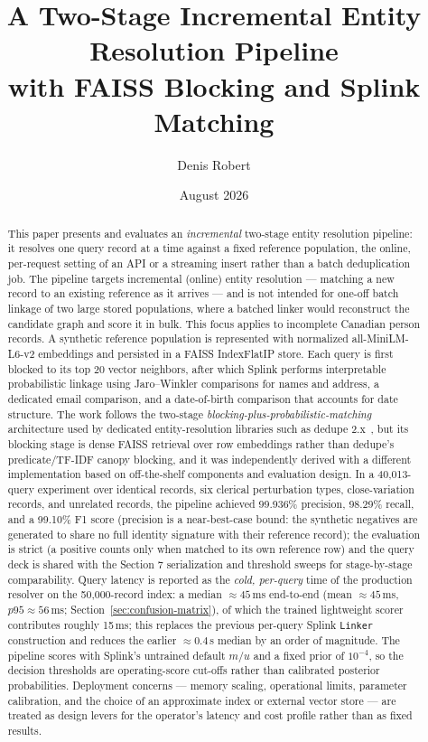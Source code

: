 \documentclass[11pt]{article}
\title{A Two-Stage Incremental Entity Resolution Pipeline\\with FAISS Blocking and Splink Matching}
\author{Denis Robert}
\date{August 2026}
\begin{document}
\maketitle

\begin{abstract}
This paper presents and evaluates an \emph{incremental} two-stage entity resolution pipeline: it resolves one query record at a time against a fixed reference population, the online, per-request setting of an API or a streaming insert rather than a batch deduplication job. The pipeline targets incremental (online) entity resolution --- matching a new record to an existing reference as it arrives --- and is not intended for one-off batch linkage of two large stored populations, where a batched linker would reconstruct the candidate graph and score it in bulk. This focus applies to incomplete Canadian person records. A synthetic reference population is represented with normalized all-MiniLM-L6-v2 embeddings and persisted in a FAISS IndexFlatIP store. Each query is first blocked to its top 20 vector neighbors, after which Splink performs interpretable probabilistic linkage using Jaro--Winkler comparisons for names and address, a dedicated email comparison, and a date-of-birth comparison that accounts for date structure. The work follows the two-stage \emph{blocking-plus-probabilistic-matching} architecture used by dedicated entity-resolution libraries such as dedupe 2.x~\cite{dedupe2022}, but its blocking stage is dense FAISS retrieval over row embeddings rather than dedupe's predicate/TF-IDF canopy blocking, and it was independently derived with a different implementation based on off-the-shelf components and evaluation design. In a 40{,}013-query experiment over identical records, six clerical perturbation types, close-variation records, and unrelated records, the pipeline achieved 99.936\% precision, 98.29\% recall, and a 99.10\% F1 score (precision is a near-best-case bound: the synthetic negatives are generated to share no full identity signature with their reference record); the evaluation is strict (a positive counts only when matched to its own reference row) and the query deck is shared with the Section 7 serialization and threshold sweeps for stage-by-stage comparability. Query latency is reported as the \emph{cold, per-query} time of the production resolver on the 50{,}000-record index: a median $\approx 45$\,ms end-to-end (mean $\approx 45$\,ms, $p95 \approx 56$\,ms; Section~\ref{sec:confusion-matrix}), of which the trained lightweight scorer contributes roughly 15\,ms; this replaces the previous per-query Splink \texttt{Linker} construction and reduces the earlier $\approx 0.4$\,s median by an order of magnitude. The pipeline scores with Splink's untrained default $m/u$ and a fixed prior of $10^{-4}$, so the decision thresholds are operating-score cut-offs rather than calibrated posterior probabilities. Deployment concerns --- memory scaling, operational limits, parameter calibration, and the choice of an approximate index or external vector store --- are treated as design levers for the operator's latency and cost profile rather than as fixed results.
\end{abstract}
\end{document}
